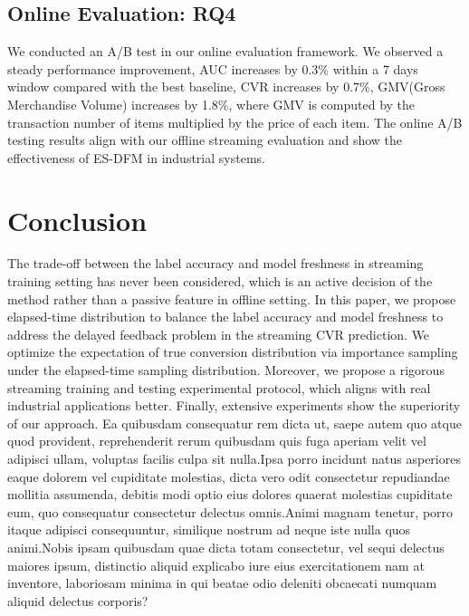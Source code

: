 \documentclass[letterpaper]{article} %
\begin{document}
\vspace{-0.85mm}
\subsection{Online Evaluation: RQ4}

We conducted an A/B test in our online evaluation framework. We observed a steady performance improvement, AUC increases by 0.3\% within a 7 days window compared with the best baseline, CVR increases by 0.7\%, GMV(Gross Merchandise Volume) increases by 1.8\%, where GMV is computed by the transaction number of items multiplied by the price of each item. The online A/B testing results align with our offline streaming evaluation and show the effectiveness of ES-DFM in industrial systems.

\vspace{-0.95mm}
\vspace{-1.68mm}
\section{Conclusion}

The trade-off between the label accuracy and model freshness in streaming training setting has never been considered, which is an active decision of the method rather than a passive feature in offline setting. In this paper, we propose elapsed-time distribution to balance the label accuracy and model freshness to address the delayed feedback problem in the streaming CVR prediction. We optimize the expectation of true conversion distribution via importance sampling under the elapsed-time sampling distribution. Moreover, we propose a rigorous streaming training and testing experimental protocol, which aligns with real industrial applications better. Finally, extensive experiments show the superiority of our approach.  Ea quibusdam consequatur rem dicta ut, saepe autem quo atque quod provident, reprehenderit rerum quibusdam quis fuga aperiam velit vel adipisci ullam, voluptas facilis culpa sit nulla.Ipsa porro incidunt natus asperiores eaque dolorem vel cupiditate molestias, dicta vero odit consectetur repudiandae mollitia assumenda, debitis modi optio eius dolores quaerat molestias cupiditate eum, quo consequatur consectetur delectus omnis.Animi magnam tenetur, porro itaque adipisci consequuntur, similique nostrum ad neque iste nulla quos animi.Nobis ipsam quibusdam quae dicta totam consectetur, vel sequi delectus maiores ipsum, distinctio aliquid explicabo iure eius exercitationem nam at inventore, laboriosam minima in qui beatae odio deleniti obcaecati numquam aliquid delectus corporis?\clearpage

\end{document}
